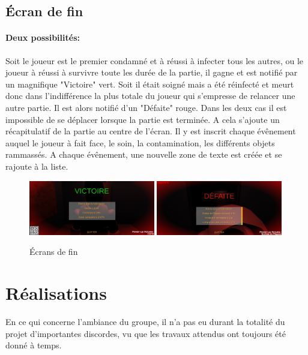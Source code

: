 \documentclass{article}
\begin{document}
\subsection{Écran de fin}
\paragraph{Deux possibilités:}
Soit le joueur est le premier condamné et à réussi à infecter tous les autres, ou le joueur à réussi à survivre toute les durée de la partie, il gagne et est notifié par un magnifique "Victoire" vert. Soit il était soigné mais a été réinfecté et meurt donc dans l'indifférence la plus totale du joueur qui s'empresse de relancer une autre partie. Il est alors notifié d'un "Défaite" rouge. Dans les deux cas il est impossible de se déplacer lorsque la partie est terminée. A cela s'ajoute un récapitulatif de la partie au centre de l'écran. Il y est inscrit chaque évênement auquel le joueur à fait face, le soin, la contamination, les différents objets rammassés. A chaque évênement, une nouvelle zone de texte est créée et se rajoute à la liste.

\begin{figure}[H]
	\centering
	\includegraphics[width=0.49\textwidth]{Victoire.png}
	\includegraphics[width=0.49\textwidth]{Defaite.png}
	\caption{Écrans de fin}
	\label{Écrans de fin}
\end{figure}



\newpage
\section{Réalisations}
En ce qui concerne l'ambiance du groupe, il n'a pas eu durant la totalité du projet d'importantes discordes, vu que les travaux attendus ont toujours été donné à temps.
\end{document}
